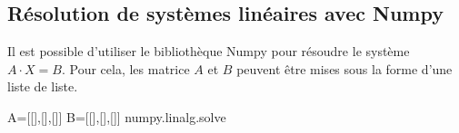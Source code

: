 \documentclass[10pt]{article}
\begin{document}

\subsection{Résolution de systèmes linéaires avec Numpy}
Il est possible d'utiliser le bibliothèque Numpy pour résoudre le système $A\cdot X = B$. 
Pour cela, les matrice $A$ et $B$ peuvent être mises sous la forme d'une liste de liste. 

\begin{py}
\begin{python}
A=[[],[],[]]
B=[[],[],[]]
numpy.linalg.solve
\end{python}
\end{py}

\begin{thebibliography}{2}
\end{thebibliography}
\end{document}
